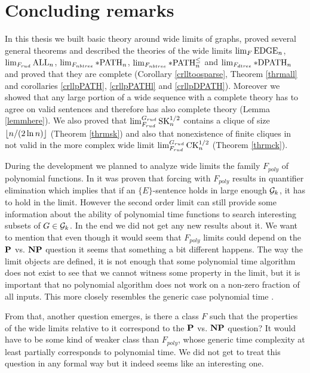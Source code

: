 \chapter*{Concluding remarks}

In this thesis we built basic theory around wide limits of graphs, proved several general theorems and described the theories of the wide limits $\lim_F\EDGE_n$, $\lim_{F_{rud}}\ALL_n$, $\lim_{F_{nbtree}}\pPATH_n$, $\lim_{F_{nbtree}}\pPATHl_n$ and $\lim_{F_{dtree}}\pDPATH_n$ and proved that they are complete (Corollary \ref{crlltoosparse}, Theorem \ref{thrmall} and corollaries \ref{crllpPATH}, \ref{crllpPATHl} and \ref{crllpDPATH}). Moreover we showed that any large portion of a wide sequence with a complete theory has to agree on valid sentences and therefore has also complete theory (Lemma \ref{lemmhere}). We also proved that $\lim_{F_{rud}}^{G_{rud}}\SK_n^{1/2}$ contains a clique of size $\floor{n/(2\ln n)}$ (Theorem \ref{thrmsk}) and also that nonexistence of finite cliques in not valid in the more complex wide limit $\lim_{F_{rud}}^{G_{rud}}\CK_n^{1/2}$ (Theorem \ref{thrmck}).

During the development we planned to analyze wide limits the family $F_{poly}$ of polynomial functions. In \cite{krajicek2010forcing} it was proven that forcing with $F_{poly}$ results in quantifier elimination which implies that if an $\{E\}$-sentence holds in large enough $\G_k$, it has to hold in the limit. However the second order limit can still provide some information about the ability of polynomial time functions to search interesting subsets of $G\in\G_k$. In the end we did not get any new results about it. We want to mention that even though it would seem that $F_{poly}$ limits could depend on the $\P$ vs. $\NP$ question it seems that something a bit different happens. The way the limit objects are defined, it is not enough that some polynomial time algorithm does not exist to see that we cannot witness some property in the limit, but it is important that no polynomial algorithm does not work on a non-zero fraction of all inputs. This more closely resembles the generic case polynomial time \cite{gilman2007report}.

From that, another question emerges, is there a class $F$ such that the properties of the wide limits relative to it correspond to the $\P$ vs. $\NP$ question? It would have to be some kind of weaker class than $F_{poly}$, whose generic time complexity at least partially corresponds to polynomial time. We did not get to treat this question in any formal way but it indeed seems like an interesting one.

